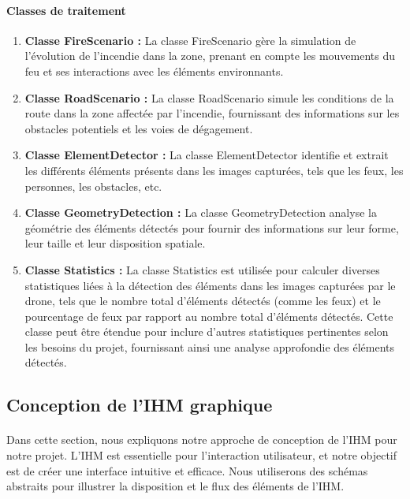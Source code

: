 \paragraph{Classes de traitement}  
\begin{enumerate}

\item \textbf{Classe FireScenario :} La classe FireScenario gère la simulation de l'évolution de l'incendie dans la zone, prenant en compte les mouvements du feu et ses interactions avec les éléments environnants.
\item \textbf{Classe RoadScenario :} La classe RoadScenario simule les conditions de la route dans la zone affectée par l'incendie, fournissant des informations sur les obstacles potentiels et les voies de dégagement.

\item \textbf{Classe ElementDetector :} La classe ElementDetector identifie et extrait les différents éléments présents dans les images capturées, tels que les feux, les personnes, les obstacles, etc.
\item \textbf{Classe GeometryDetection :} La classe GeometryDetection analyse la géométrie des éléments détectés pour fournir des informations sur leur forme, leur taille et leur disposition spatiale.

\item \textbf{Classe Statistics :}  La classe Statistics est utilisée pour calculer
diverses statistiques liées à la détection des éléments dans les images
capturées par le drone, tels que le nombre total d'éléments détectés
(comme les feux) et le pourcentage de feux par rapport au nombre total
d'éléments détectés. Cette classe peut être étendue pour inclure d'autres
statistiques pertinentes selon les besoins du projet, fournissant ainsi une
analyse approfondie des éléments détectés.
\end{enumerate}


\subsection{Conception de l'IHM graphique}

\paragraph{} Dans cette section, nous expliquons notre approche de conception de l'IHM pour notre projet. L'IHM est essentielle pour l'interaction utilisateur, et notre objectif est de créer une interface intuitive et efficace. Nous utiliserons des schémas abstraits pour illustrer la disposition et le flux des éléments de l'IHM.

